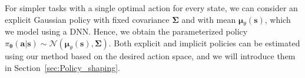 For simpler tasks with a single optimal action for every state, we can consider an explicit Gaussian policy with fixed covariance $\bm \Sigma$ and with mean $\bm \mu_{\theta}(\bm s)$, which we model using a DNN. Hence, we obtain the parameterized policy $\pi_{\bm \theta}(\bm a | \bm s) \sim \mathcal{N}\left (\bm \mu_{\theta}(\bm s), \bm \Sigma\right)$.
Both explicit and implicit policies can be estimated using our method based on the desired action space, and we will introduce them in Section~\ref{sec:Policy_shaping}.












